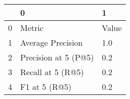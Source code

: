 \begin{tabular}{lll}
\toprule
{} &                     0 &      1 \\
\midrule
0 &                Metric &  Value \\
1 &     Average Precision &    1.0 \\
2 &  Precision at 5 (P@5) &    0.2 \\
3 &     Recall at 5 (R@5) &    0.2 \\
4 &         F1 at 5 (R@5) &    0.2 \\
\bottomrule
\end{tabular}
